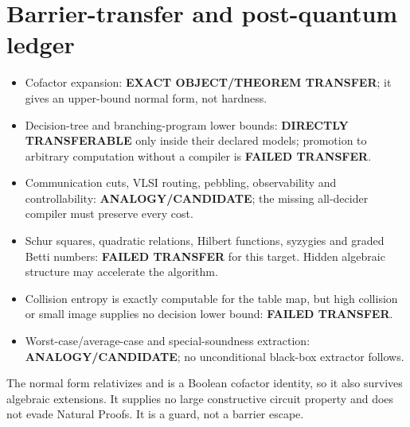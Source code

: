\documentclass[11pt]{article}
\newcommand{\Status}[1]{\textbf{#1}}
\begin{document}
\section{Barrier-transfer and post-quantum ledger}
\begin{itemize}
 \item Cofactor expansion: \Status{EXACT OBJECT/THEOREM TRANSFER}; it gives an
 upper-bound normal form, not hardness.
 \item Decision-tree and branching-program lower bounds:
 \Status{DIRECTLY TRANSFERABLE} only inside their declared models; promotion to
 arbitrary computation without a compiler is \Status{FAILED TRANSFER}.
 \item Communication cuts, VLSI routing, pebbling, observability and
 controllability: \Status{ANALOGY/CANDIDATE}; the missing all-decider compiler
 must preserve every cost.
 \item Schur squares, quadratic relations, Hilbert functions, syzygies and
 graded Betti numbers: \Status{FAILED TRANSFER} for this target. Hidden
 algebraic structure may accelerate the algorithm.
 \item Collision entropy is exactly computable for the table map, but high
 collision or small image supplies no decision lower bound:
 \Status{FAILED TRANSFER}.
 \item Worst-case/average-case and special-soundness extraction:
 \Status{ANALOGY/CANDIDATE}; no unconditional black-box extractor follows.
\end{itemize}
The normal form relativizes and is a Boolean cofactor identity, so it also
survives algebraic extensions. It supplies no large constructive circuit
property and does not evade Natural Proofs. It is a guard, not a barrier escape.
\end{document}
